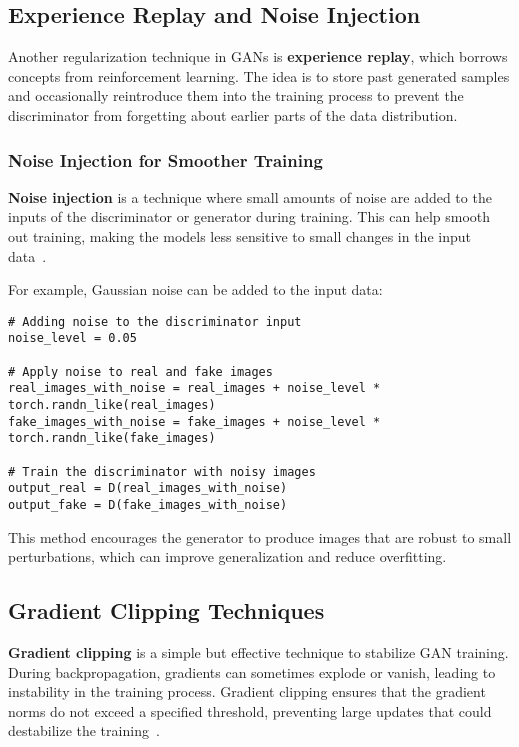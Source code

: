 \subsection{Experience Replay and Noise Injection}

Another regularization technique in GANs is \textbf{experience replay}, which borrows concepts from reinforcement learning. The idea is to store past generated samples and occasionally reintroduce them into the training process to prevent the discriminator from forgetting about earlier parts of the data distribution.

\subsubsection{Noise Injection for Smoother Training}
\textbf{Noise injection} is a technique where small amounts of noise are added to the inputs of the discriminator or generator during training. This can help smooth out training, making the models less sensitive to small changes in the input data~\cite{feng2021understanding}.

For example, Gaussian noise can be added to the input data:
\begin{lstlisting}[style=python]
# Adding noise to the discriminator input
noise_level = 0.05

# Apply noise to real and fake images
real_images_with_noise = real_images + noise_level * torch.randn_like(real_images)
fake_images_with_noise = fake_images + noise_level * torch.randn_like(fake_images)

# Train the discriminator with noisy images
output_real = D(real_images_with_noise)
output_fake = D(fake_images_with_noise)
\end{lstlisting}

This method encourages the generator to produce images that are robust to small perturbations, which can improve generalization and reduce overfitting.

\subsection{Gradient Clipping Techniques}
\textbf{Gradient clipping} is a simple but effective technique to stabilize GAN training. During backpropagation, gradients can sometimes explode or vanish, leading to instability in the training process. Gradient clipping ensures that the gradient norms do not exceed a specified threshold, preventing large updates that could destabilize the training~\cite{zhang2019gradient}.

